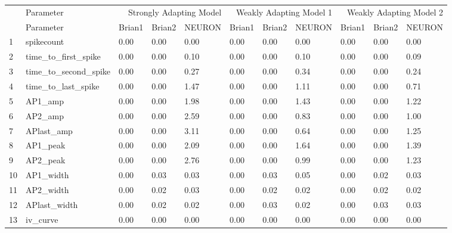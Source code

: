 \begin{tabular}{lllllllllll}
 & Parameter & \multicolumn{3}{r}{Strongly Adapting Model} & \multicolumn{3}{r}{Weakly Adapting Model 1} & \multicolumn{3}{r}{Weakly Adapting Model 2} \\
 & Parameter & Brian1 & Brian2 & NEURON & Brian1 & Brian2 & NEURON & Brian1 & Brian2 & NEURON \\
1 & spikecount & 0.00 & 0.00 & 0.00 & 0.00 & 0.00 & 0.00 & 0.00 & 0.00 & 0.00 \\
2 & time_to_first_spike & 0.00 & 0.00 & 0.10 & 0.00 & 0.00 & 0.10 & 0.00 & 0.00 & 0.09 \\
3 & time_to_second_spike & 0.00 & 0.00 & 0.27 & 0.00 & 0.00 & 0.34 & 0.00 & 0.00 & 0.24 \\
4 & time_to_last_spike & 0.00 & 0.00 & 1.47 & 0.00 & 0.00 & 1.11 & 0.00 & 0.00 & 0.71 \\
5 & AP1_amp & 0.00 & 0.00 & 1.98 & 0.00 & 0.00 & 1.43 & 0.00 & 0.00 & 1.22 \\
6 & AP2_amp & 0.00 & 0.00 & 2.59 & 0.00 & 0.00 & 0.83 & 0.00 & 0.00 & 1.00 \\
7 & APlast_amp & 0.00 & 0.00 & 3.11 & 0.00 & 0.00 & 0.64 & 0.00 & 0.00 & 1.25 \\
8 & AP1_peak & 0.00 & 0.00 & 2.09 & 0.00 & 0.00 & 1.64 & 0.00 & 0.00 & 1.39 \\
9 & AP2_peak & 0.00 & 0.00 & 2.76 & 0.00 & 0.00 & 0.99 & 0.00 & 0.00 & 1.23 \\
10 & AP1_width & 0.00 & 0.03 & 0.03 & 0.00 & 0.03 & 0.05 & 0.00 & 0.02 & 0.03 \\
11 & AP2_width & 0.00 & 0.02 & 0.03 & 0.00 & 0.02 & 0.02 & 0.00 & 0.02 & 0.02 \\
12 & APlast_width & 0.00 & 0.02 & 0.02 & 0.00 & 0.03 & 0.02 & 0.00 & 0.03 & 0.03 \\
13 & iv_curve & 0.00 & 0.00 & 0.00 & 0.00 & 0.00 & 0.00 & 0.00 & 0.00 & 0.00 \\
\end{tabular}
